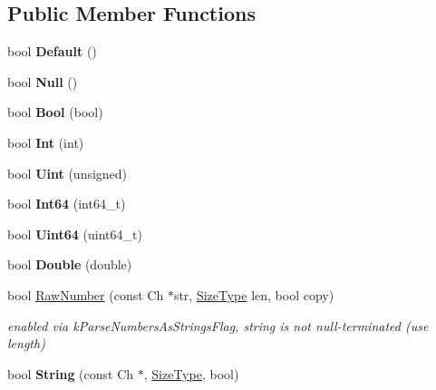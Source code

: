 \subsection*{Public Member Functions}
\begin{DoxyCompactItemize}
\item 
\mbox{\label{a02216_a836437f6ccc37f08ff933f009b18a78c}} 
bool {\bfseries Default} ()
\item 
\mbox{\label{a02216_ae2ebbde4628bf3659ddc5d18520935f5}} 
bool {\bfseries Null} ()
\item 
\mbox{\label{a02216_aa1c3ce42dbb856b3349792dc9d963587}} 
bool {\bfseries Bool} (bool)
\item 
\mbox{\label{a02216_a85e813aaf7189a2f87bd53953324fafc}} 
bool {\bfseries Int} (int)
\item 
\mbox{\label{a02216_a0e683306cbb7b4e350a35c18c5246f2a}} 
bool {\bfseries Uint} (unsigned)
\item 
\mbox{\label{a02216_a04011733ea584739c97ad5c6afa15a35}} 
bool {\bfseries Int64} (int64\+\_\+t)
\item 
\mbox{\label{a02216_a351aa3cd81856a487c21022e9cc64d2b}} 
bool {\bfseries Uint64} (uint64\+\_\+t)
\item 
\mbox{\label{a02216_a8156ea6ae5b8cd23a8b700e92a8af1eb}} 
bool {\bfseries Double} (double)
\item 
\mbox{\label{a02216_a9ed0d83d5e6c8f5e4b32ca3735ff0bb7}} 
bool \hyperlink{a02216_a9ed0d83d5e6c8f5e4b32ca3735ff0bb7}{Raw\+Number} (const Ch $\ast$str, \hyperlink{a00560_a5ed6e6e67250fadbd041127e6386dcb5}{Size\+Type} len, bool copy)
\begin{DoxyCompactList}\small\item\em enabled via k\+Parse\+Numbers\+As\+Strings\+Flag, string is not null-\/terminated (use length) \end{DoxyCompactList}\item 
\mbox{\label{a02216_a3ac69e6326d0aeef7b1f2619742bbe00}} 
bool {\bfseries String} (const Ch $\ast$, \hyperlink{a00560_a5ed6e6e67250fadbd041127e6386dcb5}{Size\+Type}, bool)

\end{DoxyCompactItemize}
